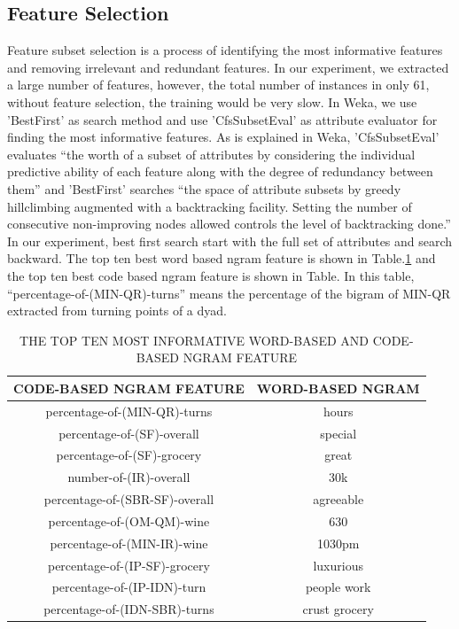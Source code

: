 \documentclass[11pt]{article} %
\begin{document}
\subsection{Feature Selection}
\label{sec:fv_selection}
Feature subset selection is a process of identifying the most informative features and removing irrelevant and redundant features. In our experiment, we extracted a large number of features, however, the total number of instances in only 61, without feature selection, the training would be very slow. In Weka, we use 'BestFirst' as search method and use 'CfsSubsetEval' as attribute evaluator for finding the most informative features. As is explained in Weka, 'CfsSubsetEval' evaluates ``the worth of a subset of attributes by considering the individual predictive ability of each feature along with the degree of redundancy between them'' and 'BestFirst' searches ``the space of attribute subsets by greedy hillclimbing augmented with a backtracking facility. Setting the number of consecutive non-improving nodes allowed controls the level of backtracking done.'' In our experiment, best first search start with the full set of attributes and search backward. The top ten best word based ngram feature is shown in Table.\ref{tab:selected_ngram} and the top ten best code based ngram feature is shown in Table. In this table, ``percentage-of-(MIN-QR)-turns'' means the percentage of the bigram of MIN-QR extracted from turning points of a dyad.
\begin{table}
  \centering
  \caption{THE TOP TEN MOST INFORMATIVE WORD-BASED AND CODE-BASED NGRAM FEATURE}
  \begin{tabular}{|c|c|}
     \hline
CODE-BASED NGRAM FEATURE & WORD-BASED NGRAM \\
  \hline
percentage-of-(MIN-QR)-turns & hours \\

percentage-of-(SF)-overall & special\\

percentage-of-(SF)-grocery & great\\

number-of-(IR)-overall & 30k\\

percentage-of-(SBR-SF)-overall & agreeable\\

percentage-of-(OM-QM)-wine & 630\\

percentage-of-(MIN-IR)-wine & 1030pm\\

percentage-of-(IP-SF)-grocery & luxurious\\

percentage-of-(IP-IDN)-turn & people work\\

percentage-of-(IDN-SBR)-turns & crust grocery\\
  \hline
  \end{tabular}\label{tab:selected_ngram}
\end{table}
\end{document}
